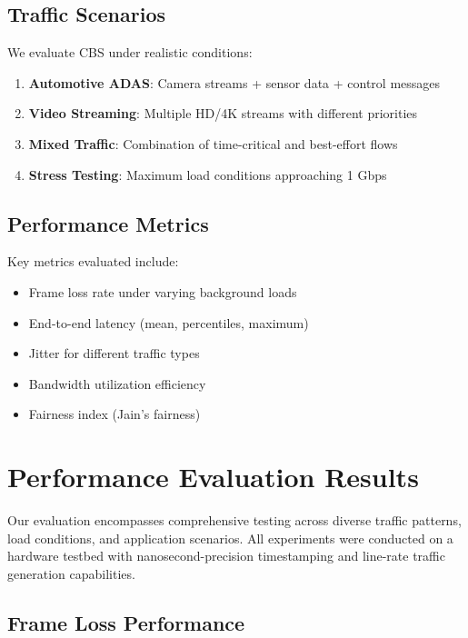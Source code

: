 \documentclass[10pt, journal, compsoc]{IEEEtran}
\begin{document}
\subsection{Traffic Scenarios}

We evaluate CBS under realistic conditions:

\begin{enumerate}
    \item \textbf{Automotive ADAS}: Camera streams + sensor data + control messages
    \item \textbf{Video Streaming}: Multiple HD/4K streams with different priorities
    \item \textbf{Mixed Traffic}: Combination of time-critical and best-effort flows
    \item \textbf{Stress Testing}: Maximum load conditions approaching 1 Gbps
\end{enumerate}

\subsection{Performance Metrics}

Key metrics evaluated include:

\begin{itemize}
    \item Frame loss rate under varying background loads
    \item End-to-end latency (mean, percentiles, maximum)
    \item Jitter for different traffic types
    \item Bandwidth utilization efficiency
    \item Fairness index (Jain's fairness)
\end{itemize}

\section{Performance Evaluation Results}

Our evaluation encompasses comprehensive testing across diverse traffic patterns, load conditions, and application scenarios. All experiments were conducted on a hardware testbed with nanosecond-precision timestamping and line-rate traffic generation capabilities.

\subsection{Frame Loss Performance}
\end{document}
